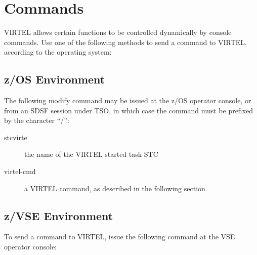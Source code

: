 \documentclass[letterpaper,10pt,english]{sphinxmanual}
\begin{document}
\section{Commands}
\label{\detokenize{audit_operations_ and_performance:commands}}\label{\detokenize{audit_operations_ and_performance:index-0}}
VIRTEL allows certain functions to be controlled dynamically by console commands. Use one of the following methods to send a command to VIRTEL, according to the operating system:

\ignorespaces 

\subsection{z/OS Environment}
\label{\detokenize{audit_operations_ and_performance:z-os-environment}}\label{\detokenize{audit_operations_ and_performance:index-1}}
The following modify command may be issued at the z/OS operator console, or from an SDSF session under TSO, in which case the command must be prefixed by the character “/”:

\begin{sphinxVerbatim}[commandchars=\\\{\}]
 
\end{sphinxVerbatim}
\begin{description}
\item[{stcvirte}] \leavevmode
the name of the VIRTEL started task STC

\item[{virtel-cmd}] \leavevmode
a VIRTEL command, as described in the following section.

\end{description}

\ignorespaces 

\subsection{z/VSE Environment}
\label{\detokenize{audit_operations_ and_performance:z-vse-environment}}\label{\detokenize{audit_operations_ and_performance:index-2}}
To send a command to VIRTEL, issue the following command at the VSE operator console:
\end{document}
